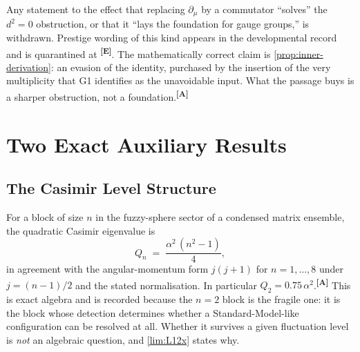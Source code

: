 \documentclass[12pt,a4paper,twoside]{article}
\theoremstyle{plain}
\theoremstyle{definition}
\theoremstyle{remark}
\newcommand{\catmark}[1]{\textsuperscript{\textsf{\textbf{[#1]}}}}
\begin{document}
\begin{governancebox}
Any statement to the effect that replacing $\partial_\mu$ by a
commutator ``solves'' the $d^2 = 0$ obstruction, or that it ``lays the
foundation for gauge groups,'' is withdrawn. Prestige wording of this
kind appears in the developmental record and is quarantined at
\catmark{E}. The mathematically correct claim is
\cref{prop:inner-derivation}: an evasion of the identity, purchased by
the insertion of the very multiplicity that G1 identifies as the
unavoidable input. What the passage buys is a sharper obstruction, not a
foundation.\catmark{A}
\end{governancebox}

\section{Two Exact Auxiliary Results}
\label{sec:auxiliary-exact}

\subsection{The Casimir Level Structure}
\label{subsec:casimir-levels}

For a block of size $n$ in the fuzzy-sphere sector of a condensed matrix
ensemble, the quadratic Casimir eigenvalue is
\begin{equation}
 Q_n \;=\; \frac{\alpha^2\,(n^2-1)}{4},
 \label{eq:casimir}
\end{equation}
in agreement with the angular-momentum form $j(j+1)$ for $n = 1,\ldots,8$
under $j = (n-1)/2$ and the stated normalisation. In particular
$Q_2 = 0.75\,\alpha^2$.\catmark{A} This is exact algebra and is recorded
because the $n=2$ block is the fragile one: it is the block whose
detection determines whether a Standard-Model-like configuration can be
resolved at all. Whether it survives a given fluctuation level is
\emph{not} an algebraic question, and \cref{lim:L12x} states why.
\end{document}
